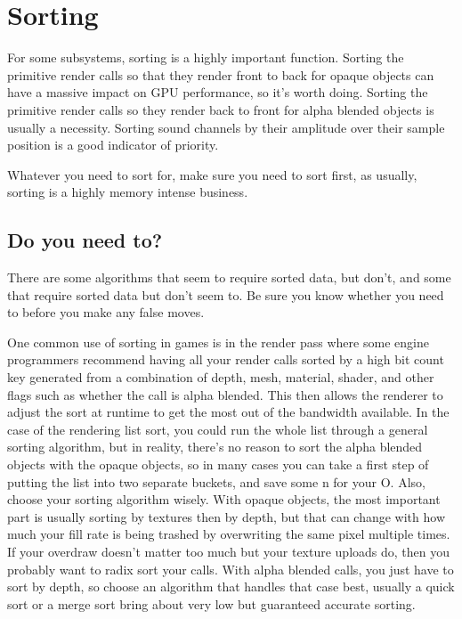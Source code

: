 \chapter{Sorting}

For some subsystems, sorting is a highly important function. Sorting the
primitive render calls so that they render front to back for opaque objects
can have a massive impact on GPU performance, so it's worth doing. Sorting the
primitive render calls so they render back to front for alpha blended objects
is usually a necessity. Sorting sound channels by their amplitude over their
sample position is a good indicator of priority.

Whatever you need to sort for, make sure you need to sort first, as usually,
sorting is a highly memory intense business.

\section{Do you need to?}

There are some algorithms that seem to require sorted data, but don't, and some
that require sorted data but don't seem to. Be sure you know whether you need
to before you make any false moves.

One common use of sorting in games is in the render pass where some engine
programmers recommend having all your render calls sorted by a high bit count
key generated from a combination of depth, mesh, material, shader, and other
flags such as whether the call is alpha blended. This then allows the renderer
to adjust the sort at runtime to get the most out of the bandwidth available.
In the case of the rendering list sort, you could run the whole list through a
general sorting algorithm, but in reality, there's no reason to sort the alpha
blended objects with the opaque objects, so in many cases you can take a first
step of putting the list into two separate buckets, and save some n for your O.
Also, choose your sorting algorithm wisely. With opaque objects, the most
important part is usually sorting by textures then by depth, but that can
change with how much your fill rate is being trashed by overwriting the same
pixel multiple times. If your overdraw doesn't matter too much but your texture
uploads do, then you probably want to radix sort your calls. With alpha blended
calls, you just have to sort by depth, so choose an algorithm that handles that
case best, usually a quick sort or a merge sort bring about very low but
guaranteed accurate sorting.

